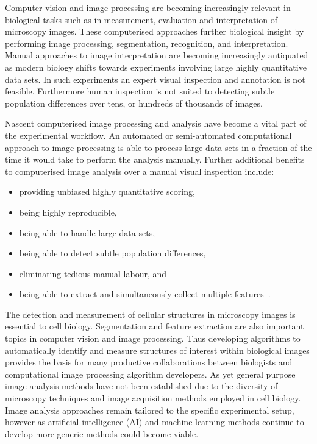 Computer vision and image processing are becoming increasingly relevant in biological tasks such as in measurement, evaluation and interpretation of microscopy images. These computerised approaches further biological insight by performing image processing, segmentation, recognition, and interpretation. Manual approaches to image interpretation are becoming increasingly antiquated as modern biology shifts towards experiments involving large highly quantitative data sets. In such experiments an expert visual inspection and annotation is not feasible. Furthermore human inspection is not suited to detecting subtle population differences over tens, or hundreds of thousands of images.

Nascent computerised image processing and analysis have become a vital part of the experimental workflow. An automated or semi-automated computational approach to image processing is able to process large data sets in a fraction of the time it would take to perform the analysis manually. Further additional benefits to computerised image analysis over a manual visual inspection include:
\begin{itemize}
\item providing unbiased highly quantitative scoring,
\item being highly reproducible,
\item being able to handle large data sets,
\item being able to detect subtle population differences,
\item eliminating tedious manual labour, and
\item being able to extract and simultaneously collect multiple features~\cite{Jones2006}.
\end{itemize}

The detection and measurement of cellular structures in microscopy images is essential to cell biology. Segmentation and feature extraction are also important topics in computer vision and image processing. Thus developing algorithms to automatically identify and measure structures of interest within biological images provides the basis for many productive collaborations between biologists and computational image processing algorithm developers. As yet general purpose image analysis methods have not been established due to the diversity of microscopy techniques and image acquisition methods employed in cell biology. Image analysis approaches remain tailored to the specific experimental setup, however as artificial intelligence (AI) and machine learning methods continue to develop more generic methods could become viable.

